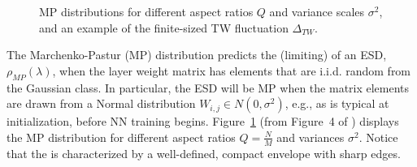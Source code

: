\begin{figure}[t] %
    \centering  
    \caption{MP distributions for different aspect ratios $Q$ and variance scales $\sigma^2$, and an example of the finite-sized TW fluctuation $\Delta_{TW}$. }
   \label{fig:MP-esds}
\end{figure}

The Marchenko-Pastur (MP) distribution predicts the (limiting) \SHAPE of an ESD, $\rho_{MP}(\lambda)$, when the layer weight matrix has elements that are i.i.d. random from the Gaussian \Universality class.
In particular, the ESD will be MP when the matrix elements are drawn from a Normal distribution $W_{i,j}\in  N(0,\sigma^{2})$, e.g., as is typical at initialization, before NN training begins.
Figure~\ref{fig:MP-esds} (from Figure~4 of \cite{MM18_TR_JMLRversion}) displays the MP distribution for different aspect ratios $Q=\tfrac{N}{M}$ and variances $\sigma^{2}$.  
Notice that the \SHAPE is characterized by a well-defined, compact envelope with sharp edges.

